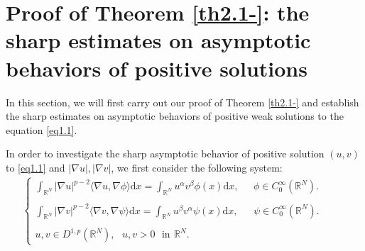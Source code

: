 \documentclass[12pt]{amsart}
\theoremstyle{definition}
\theoremstyle{remark}
\theoremstyle{conclusion}
\theoremstyle{conjecture}
\numberwithin{equation}{section}
\newcommand{\R}{\mathbb{R}}
\begin{document}
\section{Proof of Theorem \ref{th2.1-}: the sharp estimates on asymptotic behaviors of positive solutions}\label{sc3}

In this section, we will first carry out our proof of Theorem \ref{th2.1-} and establish the sharp estimates on asymptotic behaviors of positive weak solutions to the equation \eqref{eq1.1}.

\smallskip

In order to investigate the sharp asymptotic behavior of positive solution $(u, v)$ to \eqref{eq1.1} and $|\nabla u|,|\nabla v|$, we first consider the following system:
\begin{align}\label{eq10.25.1}
\left\{ \begin{array}{ll}
\int_{\R^N} |\nabla u|^{p-2} \langle \nabla u, \nabla\phi\rangle \mathrm{d}x = \int_{\R^N}u^{\alpha}v^{\beta}\phi(x)\mathrm{d}x, \,\,\,\,&  \phi \in C_0^\infty(\R^N). \\ \\
\int_{\R^N} |\nabla v|^{p-2} \langle \nabla v, \nabla\psi\rangle \mathrm{d}x = \int_{\R^N}u^{\beta}v^{\alpha}\psi(x)\mathrm{d}x, \,\,\,\,&  \psi \in C_0^\infty(\R^N). \\ \\
u,v \in D^{1,p}(\R^N), \,\,\,\,u,v>0\,\,\,\,  \mbox{in}\, \  \R^N.
\end{array}
\right.\hspace{1cm}
\end{align}
\end{document}

